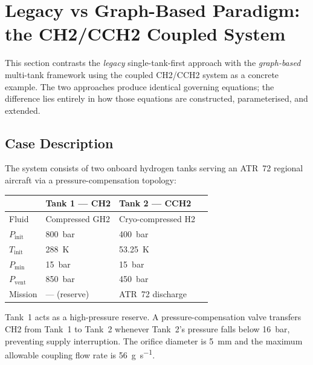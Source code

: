 \section{Legacy vs Graph-Based Paradigm: the CH2/CCH2 Coupled System}
\label{sec:comparison}

This section contrasts the \emph{legacy} single-tank-first approach with the
\emph{graph-based} multi-tank framework using the coupled CH2/CCH2 system as a
concrete example.  The two approaches produce identical governing equations; the
difference lies entirely in how those equations are constructed, parameterised,
and extended.

\subsection{Case Description}
\label{sec:comparison:case}

The system consists of two onboard hydrogen tanks serving an ATR~72 regional
aircraft via a pressure-compensation topology:

\begin{center}
\begin{tabularx}{\linewidth}{@{} l l l l @{}}
\toprule
& \textbf{Tank 1 --- CH2} & \textbf{Tank 2 --- CCH2} \\
\midrule
Fluid          & Compressed GH2  & Cryo-compressed H2 \\
$P_\text{init}$  & \SI{800}{\bar}  & \SI{400}{\bar} \\
$T_\text{init}$  & \SI{288}{\kelvin} & \SI{53.25}{\kelvin} \\
$P_\text{min}$   & \SI{15}{\bar}   & \SI{15}{\bar} \\
$P_\text{vent}$  & \SI{850}{\bar}  & \SI{450}{\bar} \\
Mission         & --- (reserve)      & ATR~72 discharge \\
\bottomrule
\end{tabularx}
\end{center}

\noindent Tank~1 acts as a high-pressure reserve.  A pressure-compensation
valve transfers CH2 from Tank~1 to Tank~2 whenever Tank~2's pressure falls
below \SI{16}{\bar}, preventing supply interruption.  The orifice diameter
is \SI{5}{\milli\metre} and the maximum allowable coupling flow rate is
\SI{56}{\gram\per\second}.

